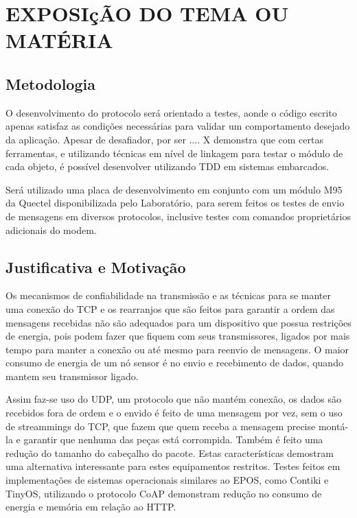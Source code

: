 

\section{EXPOSI\c{c}\~AO DO TEMA OU MAT\'ERIA}

\subsection{Metodologia}

O desenvolvimento do protocolo ser\'a orientado a testes, aonde o c\'odigo escrito apenas satisfaz as condi\c{c}\~oes necess\'arias para validar um comportamento desejado da aplica\c{c}\~ao.
Apesar de desafiador, por ser .... X demonstra que com certas ferramentas, e utilizando t\'ecnicas em n\'ivel de linkagem para testar o m\'odulo de cada objeto, \'e poss\'ivel desenvolver utilizando TDD em sistemas embarcados.

Ser\'a utilizado uma placa de desenvolvimento em conjunto com um m\'odulo M95 da Quectel disponibilizada pelo Laborat\'orio, para serem feitos os testes de envio de mensagens em diversos protocolos, inclusive testes com comandos propriet\'arios adicionais do modem.

\subsection{Justificativa e Motiva\c{c}\~ao}

Os mecanismos de confiabilidade na transmiss\~ao e as t\'ecnicas para se manter uma conex\~ao do TCP e os rearranjos que s\~ao feitos para garantir a ordem das mensagens recebidas n\~ao s\~ao adequados para um dispositivo que possua restri\c{c}\~oes de energia, pois podem fazer que fiquem com seus transmissores, ligados por mais tempo para manter a conex\~ao ou at\'e mesmo para reenvio de mensagens. O maior consumo de energia de um n\'o sensor \'e no envio e recebimento de dados, quando mantem seu transmissor ligado.

Assim faz-se uso do UDP, um protocolo que n\~ao mant\'em conex\~ao, os dados s\~ao recebidos fora de ordem e o envido \'e feito de uma mensagem por vez, sem o uso de streammings do TCP, que fazem que quem receba a mensagem precise mont\'a-la e garantir que nenhuma das pe\c{c}as est\'a corrompida. Tamb\'em \'e feito uma redu\c{c}\~ao do tamanho do cabe\c{c}alho do pacote. Estas caracter\'isticas demostram uma alternativa interessante para estes equipamentos restritos. Testes feitos em implementa\c{c}\~oes de sistemas operacionais similares ao EPOS, como Contiki e TinyOS, utilizando o protocolo CoAP demonstram redu\c{c}\~ao no consumo de energia e mem\'oria em rela\c{c}\~ao ao HTTP.\cite{}

